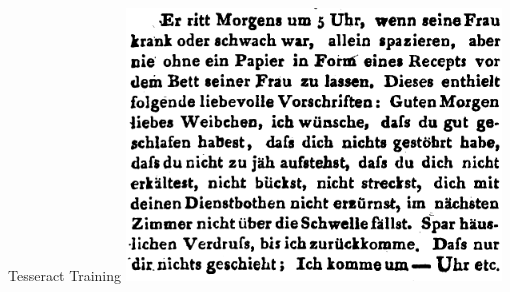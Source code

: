 \documentclass{beamer}
\begin{document}
\begin{frame}{Tesseract Training}
	\includegraphics[scale=.6]{"data/tesseractmodelcomp.png"}
\end{frame}
\end{document}
